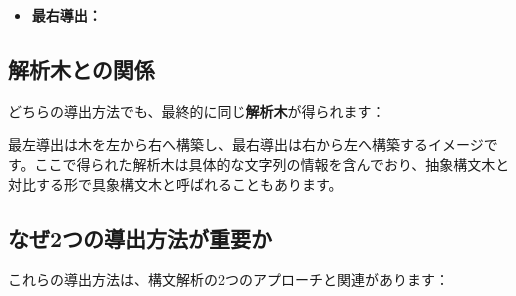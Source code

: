 \begin{itemize}
\tightlist
\item
  \textbf{最右導出：}
\end{itemize}

\begin{Shaded}
\begin{Highlighting}[]
\end{Highlighting}
\end{Shaded}

\hypertarget{chapter4-ux89e3ux6790ux6728ux3068ux306eux95a2ux4fc2}{%
\subsection{解析木との関係}\label{chapter4-ux89e3ux6790ux6728ux3068ux306eux95a2ux4fc2}}

どちらの導出方法でも、最終的に同じ\textbf{解析木}が得られます：

\begin{center}
\end{center}

最左導出は木を左から右へ構築し、最右導出は右から左へ構築するイメージです。ここで得られた解析木は具体的な文字列の情報を含んでおり、抽象構文木と対比する形で具象構文木と呼ばれることもあります。

\hypertarget{chapter4-ux306aux305c2ux3064ux306eux5c0eux51faux65b9ux6cd5ux304cux91cdux8981ux304b}{%
\subsection{なぜ2つの導出方法が重要か}\label{chapter4-ux306aux305c2ux3064ux306eux5c0eux51faux65b9ux6cd5ux304cux91cdux8981ux304b}}

これらの導出方法は、構文解析の2つのアプローチと関連があります：

